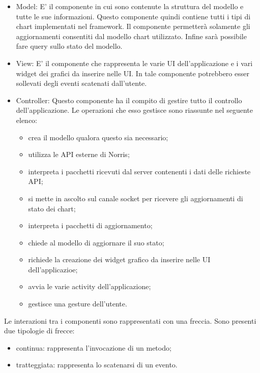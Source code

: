     	\begin{itemize}
            \item{Model:} 
        		E' il componente in cui sono contenute la struttura del modello e tutte le sue informazioni. Questo componente quindi contiene tutti i tipi di chart implementati nel framework. Il componente permetterà solamente gli aggiornamenti consentiti dal modello chart utilizzato. Infine sarà possibile fare query sullo stato del modello.
        	\item{View:}
        		E' il componente che rappresenta le varie UI dell'applicazione e i vari widget dei grafici da inserire nelle UI. In tale componente potrebbero esser sollevati degli eventi scatenati dall'utente.
        	\item{Controller:}
        		Questo componente ha il compito di gestire tutto il controllo dell'applicazione. Le operazioni che esso gestisce sono riassunte nel seguente elenco:
        		\begin{itemize}
        			\item crea il modello qualora questo sia necessario;
        			\item utilizza le API esterne di Norris;
        			\item interpreta i pacchetti ricevuti dal server contenenti i dati delle richieste API;
        			\item si mette in ascolto sul canale socket per ricevere gli aggiornamenti di stato dei chart;
        			\item interpreta i pacchetti di aggiornamento;
        			\item chiede al modello di aggiornare il suo stato;
        			\item richiede la creazione dei widget grafico da inserire nelle UI dell'applicazioe;
        			\item avvia le varie activity dell'applicazione;
        			\item gestisce una gesture dell'utente.
        		\end{itemize}
        \end{itemize}
    	Le interazioni tra i componenti sono rappresentati con una freccia. Sono presenti due tipologie di frecce:
    	\begin{itemize}
    			\item{continua: } rappresenta l'invocazione di un metodo;
    			\item{tratteggiata: } rappresenta lo scatenarsi di un evento.
    		\end{itemize}
